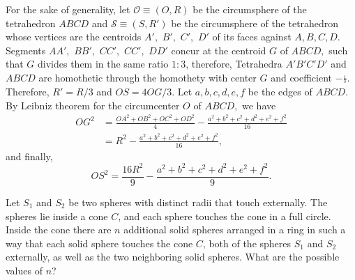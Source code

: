 \begin{solution}[name={Solution by Luis González}]
	For the sake of generality, let $\mathcal{O} \equiv (O,R)$ be the circumsphere of the tetrahedron $ABCD$ and $ \mathcal{S} \equiv (S,R')$ be the circumsphere of the tetrahedron whose vertices are the centroids $A',$ $B',$ $C',$ $D'$ of its faces against $A,B,C,D.$ Segments $AA',$ $ BB',$ $ CC',$ $ CC',$ $DD'$ concur at the centroid $G$ of $ABCD,$ such that $G$ divides them in the same ratio $1:3$, therefore, Tetrahedra $A'B'C'D'$ and $ABCD$ are homothetic through the homothety with center $G$ and coefficient $-\frac{_1}{^3}.$ Therefore, $R'=R/3$ and $OS=4OG/3.$ Let $a,b,c,d,e,f$ be the edges of $ABCD.$ By Leibniz theorem for the circumcenter $O$ of $ABCD,$ we have
	\begin{align*}
		OG^2 &= \frac{OA^2+OB^2+OC^2+OD^2}{4}-\frac{a^2+b^2+c^2+d^2+e^2+f^2}{16}\\
		&= R^2-\frac{a^2+b^2+c^2+d^2+e^2+f^2}{16},
	\end{align*}
	and finally,
	\[ OS^2=\frac{16R^2}{9}-\frac{a^2+b^2+c^2+d^2+e^2+f^2}{9}.\]
\end{solution}



\begin{question}[name={1987 IMO Longlist}]
	Let $S_1$ and $S_2$ be two spheres with distinct radii that touch externally. The spheres lie inside a cone $C$, and each sphere touches the cone in a full circle. Inside the cone there are $n$ additional solid spheres arranged in a ring in such a way that each solid sphere touches the cone $C$, both of the spheres $S_1$ and $S_2$ externally, as well as the two neighboring solid spheres. What are the possible values of $n$?
\end{question}


